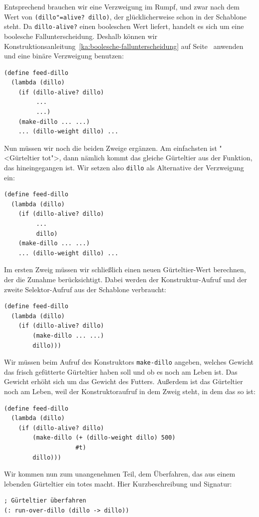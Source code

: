 Entsprechend brauchen wir eine Verzweigung im Rumpf, und zwar nach dem
Wert von \texttt{(dillo"=alive? dillo)}, der glücklicherweise schon in der
Schablone steht.  Da \texttt{dillo-alive?} einen booleschen Wert
liefert, handelt es sich um eine boolesche Fallunterscheidung.
Deshalb 
können wir Konstruktionsanleitung~\ref{ka:boolesche-fallunterscheidung}
auf Seite~\pageref{ka:boolesche-fallunterscheidung} anwenden und eine
binäre Verzweigung benutzen:
%
\begin{verbatim}
(define feed-dillo
  (lambda (dillo)
    (if (dillo-alive? dillo)
         ...
         ...)
    (make-dillo ... ...)
    ... (dillo-weight dillo) ...
\end{verbatim}
%
Nun müssen wir noch die beiden Zweige ergänzen.  Am
einfachsten ist "<Gürteltier tot">, dann nämlich kommt
das gleiche Gürteltier aus der Funktion, das hineingegangen ist.  Wir
setzen also \texttt{dillo} als Alternative der Verzweigung ein:
%
\begin{verbatim}
(define feed-dillo
  (lambda (dillo)
    (if (dillo-alive? dillo)
         ...
         dillo)
    (make-dillo ... ...)
    ... (dillo-weight dillo) ...
\end{verbatim}
%
Im ersten Zweig müssen wir schließlich einen neuen Gürteltier-Wert
berechnen, der die Zunahme berücksichtigt.  Dabei werden der
Konstruktur-Aufruf und der zweite Selektor-Aufruf aus der Schablone
verbraucht:
\begin{verbatim}
(define feed-dillo
  (lambda (dillo)
    (if (dillo-alive? dillo)
        (make-dillo ... ...)
        dillo)))
\end{verbatim}
%
Wir müssen beim Aufruf des Konstruktors \texttt{make-dillo} angeben,
welches Gewicht das frisch gefütterte Gürteltier haben soll und ob es
noch am Leben ist.  Das Gewicht erhöht sich um das Gewicht des
Futters.  Außerdem ist das Gürteltier noch am Leben, weil der
Konstruktoraufruf in dem Zweig steht, in dem das so ist:
%
\begin{verbatim}
(define feed-dillo
  (lambda (dillo)
    (if (dillo-alive? dillo)
        (make-dillo (+ (dillo-weight dillo) 500)
                    #t)
        dillo)))
\end{verbatim}
%
Wir kommen nun zum unangenehmen Teil, dem Überfahren, das aus einem
lebenden Gürteltier ein totes macht.  Hier Kurzbeschreibung und
Signatur:\label{page:run-over-dillo}
%
\begin{verbatim}
; Gürteltier überfahren
(: run-over-dillo (dillo -> dillo))
\end{verbatim}
